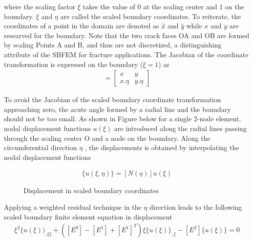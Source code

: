 \documentclass[12pt]{article}
\begin{document}
where the scaling factor $\xi$ takes the value of 0 at the scaling center and 1 on the boundary. $\xi$ and $\eta$ are called the scaled
boundary coordinates. To reiterate, the coordinates of a point in the domain are denoted as $\hat{x}$ and $\hat{y}$ while $x$ and $y$ are researved
for the boundary. Note that the two crack faces OA and OB are formed by scaling Points A and B, and thus are not
discretized, a distinguishing attribute of the SBFEM for fracture applications.
The Jacobian of the coordinate transformation  is expressed on the boundary ($\xi = 1$) as
\begin{align*}
    [J(\eta)] = \begin{bmatrix}
        x & y\\
        x.\eta & y.\eta 
    \end{bmatrix}
\end{align*}

To avoid the Jacobian of the
scaled boundary coordinate transformation approaching zero, the acute angle formed by a radial line and the boundary should not be too small.
As shown in Figure below for a single 2-node element, nodal displacement functions {$u(\xi)$} are introduced along the radial lines
passing through the scaling center O and a node on the boundary. Along the circumferential direction $\eta$ , the displacements is
obtained by interpolating the nodal displacement functions

\begin{align*}
    \{u(\xi, \eta)\} = [N(\eta)]{u(\xi)}
\end{align*}


\begin{figure}[H]
    \centering
    \captionsetup{labelformat=empty}
    \caption{Displacement in scaled boundary coordinates}  
\end{figure}

Applying a weighted residual technique in the $\eta$ direction leads to the following scaled boundary finite element equation in displacement
\begin{align*}
    [E^O]\xi^2\{u(\xi))_{,\xi\xi} + ([E^0] - [E^1] + [E^1]^T)\xi\{u(\xi)\}_{, \xi} - [E^2]\{u(\xi)\} = 0 \tag{23} \label{23}
\end{align*}
\end{document}
